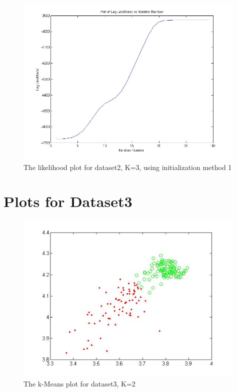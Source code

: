 \documentclass[11pt,psfig]{article}
\begin{document}
\begin{figure}[H]
\centering
\includegraphics[height=3.25in]{dataset2_EMlogLikelihoodPlot.jpg}
\caption{The likelihood plot for dataset2, K=3, using initialization method 1}
\end{figure}

\section*{Plots for Dataset3}

\begin{figure}[H]
\centering
\includegraphics[height=3.25in]{dataset3_kMeansPlot.jpg}
\caption{The k-Means plot for dataset3, K=2}
\end{figure}
\end{document}
